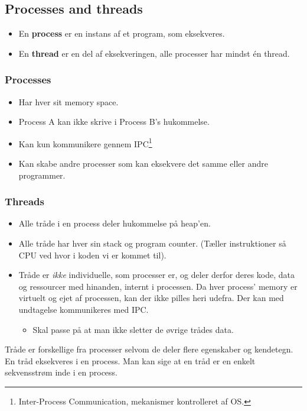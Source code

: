 \newpage

\subsection{Processes and threads}
\begin{itemize}
	\item En \textbf{process} er en instans af et program, som eksekveres.
	\item En \textbf{thread} er en del af eksekveringen, alle processer har mindst én thread.
\end{itemize}

\subsubsection{Processes}
\begin{itemize}
	\item Har hver sit memory space.
	\item Process A kan ikke skrive i Process B's hukommelse.
	\item Kan kun kommunikere gennem IPC\footnote{Inter-Process Communication, mekanismer kontrolleret af OS.}
	\item Kan skabe andre processer som kan eksekvere det samme eller andre programmer.
\end{itemize}

\subsubsection{Threads}
\begin{itemize}
	\item Alle tråde i en process deler hukommelse på heap'en.
	\item Alle tråde har hver sin stack og program counter. (Tæller instruktioner så CPU ved hvor i koden vi er kommet til).
	\item Tråde er \textit{ikke} individuelle, som processer er, og deler derfor deres kode, data og ressourcer med hinanden, internt i processen. Da hver process' memory er virtuelt og ejet af processen, kan der ikke pilles heri udefra. Der kan med undtagelse kommunikeres med IPC.
	\begin{itemize}
		\item Skal passe på at man ikke sletter de øvrige trådes data.
	\end{itemize}
\end{itemize}

Tråde er forskellige fra processer selvom de deler flere egenskaber og kendetegn. En tråd eksekveres i en process. Man kan sige at en tråd er en enkelt sekvensstrøm inde i en process.

